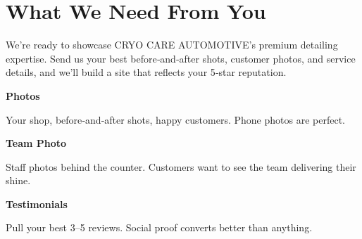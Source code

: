 \documentclass[11pt,letterpaper]{article}
\begin{document}
\vspace{0.2em}

\section*{What We Need From You}

We’re ready to showcase CRYO CARE AUTOMOTIVE’s premium detailing expertise. Send us your best before‑and‑after shots, customer photos, and service details, and we’ll build a site that reflects your 5‑star reputation.

\vspace{0.12em}

\noindent\begin{minipage}[t]{0.48\textwidth}
\begin{tcolorbox}[colframe=accent-teal, boxrule=1pt, left=0.7em, right=0.7em, top=0.5em, bottom=0.5em, arc=4pt, boxsep=0pt]
{\bfseries\small\color{accent-teal}Photos}

\vspace{0.15em}

{\small Your shop, before‑and‑after shots, happy customers. Phone photos are perfect.}
\end{tcolorbox}

\vspace{0.1em}

\begin{tcolorbox}[colframe=accent-teal, boxrule=1pt, left=0.7em, right=0.7em, top=0.5em, bottom=0.5em, arc=4pt, boxsep=0pt]
{\bfseries\small\color{accent-teal}Team Photo}

\vspace{0.15em}

{\small Staff photos behind the counter. Customers want to see the team delivering their shine.}
\end{tcolorbox}

\vspace{0.1em}

\begin{tcolorbox}[colframe=accent-teal, boxrule=1pt, left=0.7em, right=0.7em, top=0.5em, bottom=0.5em, arc=4pt, boxsep=0pt]
{\bfseries\small\color{accent-teal}Testimonials}

\vspace{0.15em}

{\small Pull your best 3–5 reviews. Social proof converts better than anything.}
\end{tcolorbox}
\end{minipage}
\hfill
\end{document}
